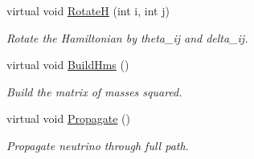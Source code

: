 \begin{DoxyCompactItemize}
virtual void \hyperlink{classOscProb_1_1PMNS__Base_aae18afd69074211335f49ec40e6011b9}{RotateH} (int i, int j)
\begin{DoxyCompactList}\small\item\em Rotate the Hamiltonian by theta\+\_\+ij and delta\+\_\+ij. \end{DoxyCompactList}\item 
virtual void \hyperlink{classOscProb_1_1PMNS__Base_ad0faf5eae755afb1baa1fcd5ffebad41}{Build\+Hms} ()
\begin{DoxyCompactList}\small\item\em Build the matrix of masses squared. \end{DoxyCompactList}\item 
virtual void \hyperlink{classOscProb_1_1PMNS__Base_a054e3a8b05b9a958b6fa416e4a835e3e}{Propagate} ()
\begin{DoxyCompactList}\small\item\em Propagate neutrino through full path. \end{DoxyCompactList}\end{DoxyCompactItemize}
